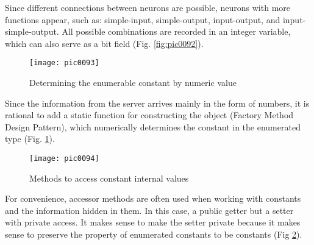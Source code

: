Since different connections between neurons are possible, neurons with more functions appear, such as: simple-input, simple-output, input-output, and input-simple-output. All possible combinations are recorded in an integer variable, which can also serve as a bit field (Fig. \ref{fig:pic0092}).

\begin{figure}[h]
\centering
\texttt{[image: pic0093]}
\caption{Determining the enumerable constant by numeric value}
\label{fig:pic0093}
\end{figure}
\FloatBarrier

Since the information from the server arrives mainly in the form of numbers, it is rational to add a static function for constructing the object (Factory Method Design Pattern), which numerically determines the constant in the enumerated type (Fig. \ref{fig:pic0093}).

\begin{figure}[h]
\centering
\texttt{[image: pic0094]}
\caption{Methods to access constant internal values}
\label{fig:pic0094}
\end{figure}
\FloatBarrier

For convenience, accessor methods are often used when working with constants and the information hidden in them. In this case, a public getter but a setter with private access. It makes sense to make the setter private because it makes sense to preserve the property of enumerated constants to be constants (Fig \ref{fig:pic0094}).
